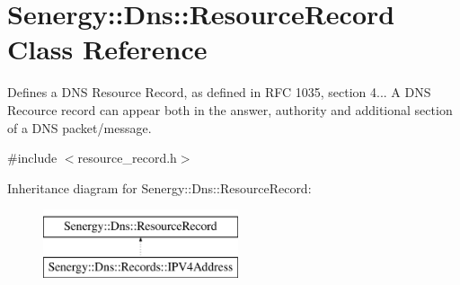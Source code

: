 \hypertarget{class_senergy_1_1_dns_1_1_resource_record}{\section{Senergy\-:\-:Dns\-:\-:Resource\-Record Class Reference}
\label{class_senergy_1_1_dns_1_1_resource_record}
}


Defines a D\-N\-S Resource Record, as defined in R\-F\-C 1035, section 4... A D\-N\-S Recource record can appear both in the answer, authority and additional section of a D\-N\-S packet/message.  




{\ttfamily \#include $<$resource\-\_\-record.\-h$>$}

Inheritance diagram for Senergy\-:\-:Dns\-:\-:Resource\-Record\-:\begin{figure}[H]
\begin{center}
\leavevmode
\includegraphics[height=2.000000cm]{class_senergy_1_1_dns_1_1_resource_record}
\end{center}
\end{figure}
